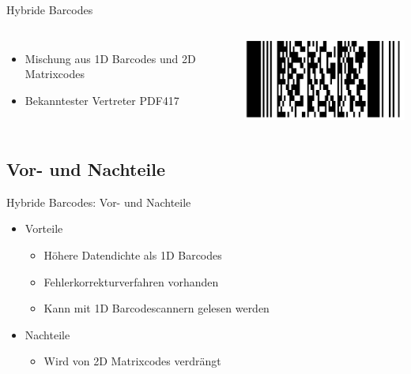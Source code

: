 \begin{frame}{Hybride Barcodes}
	\begin{columns}
		\begin{itemize}
		\item Mischung aus 1D Barcodes und 2D Matrixcodes
		\item Bekanntester Vertreter PDF417
		\end{itemize}
		\includegraphics[width=\textwidth]{muzy/pdf417.png}
	\end{columns}
\end{frame}

\subsection{Vor- und Nachteile}
\begin{frame}{Hybride Barcodes: Vor- und Nachteile}
	\begin{itemize}
	\item Vorteile
		\begin{itemize}
		\item Höhere Datendichte als 1D Barcodes
		\item Fehlerkorrekturverfahren vorhanden
		\item Kann mit 1D Barcodescannern gelesen werden
		\end{itemize}
	\item Nachteile
		\begin{itemize}
		\item Wird von 2D Matrixcodes verdrängt 
		\end{itemize}
	\end{itemize}
\end{frame}


